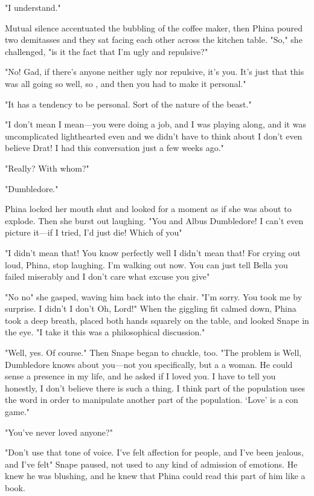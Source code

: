 "I understand."

Mutual silence accentuated the bubbling of the coffee maker, then Phina poured two demitasses and they sat facing each other across the kitchen table. "So," she challenged, "is it the fact that I'm ugly and repulsive?"

"No! Gad, if there's anyone neither ugly nor repulsive, it's you. It's just that this was all going so{\el} well, so{\el} , and then you had to make it personal."

"It has a tendency to be personal. Sort of the nature of the beast."

"I don't mean{\el} I mean—you were doing a job, and I was playing along, and it was{\el} uncomplicated{\el} lighthearted even{\el} and we didn't have to think about{\el} I don't even believe{\el} Drat! I had this conversation just a few weeks ago."

"Really? With whom?"

"Dumbledore."

Phina locked her mouth shut and looked for a moment as if she was about to explode. Then she burst out laughing. "You and Albus Dumbledore! I can't even picture it—if I tried, I'd just die! Which of you{\el}"

"I didn't mean that! You know perfectly well I didn't mean that! For crying out loud, Phina, stop laughing. I'm walking out now. You can just tell Bella you failed miserably and I don't care what excuse you give{\el}"

"No{\el} no{\el}" she gasped, waving him back into the chair. "I'm sorry. You took me by surprise. I didn't{\el} I don't{\el} Oh, Lord!" When the giggling fit calmed down, Phina took a deep breath, placed both hands squarely on the table, and looked Snape in the eye. "I take it this was a philosophical discussion."

"Well, yes. Of course." Then Snape began to chuckle, too. "The problem is{\el} Well, Dumbledore knows about you—not you specifically, but a{\el} a woman. He could sense a presence in my life, and he asked if I loved{\el} you. I have to tell you honestly, I don't believe there is such a thing. I think part of the population uses the word in order to manipulate another part of the population. `Love' is a con game."

"You've never loved anyone?"

"Don't use that tone of voice. I've felt affection for people, and I've been jealous, and I've felt{\el}" Snape paused, not used to any kind of admission of emotions. He knew he was blushing, and he knew that Phina could read this part of him like a book.

